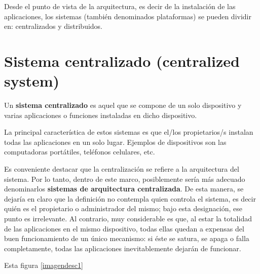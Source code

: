 \documentclass[12pt]{report} %
\begin{document}
\begin{itemize}
Desde el punto de vista de la arquitectura, es decir de la instalación de las aplicaciones, los sistemas (también denominados plataformas) se pueden dividir en: centralizados y distribuidos. 

\section{Sistema centralizado (centralized system)}

Un \textbf{sistema centralizado} es aquel que se compone de un solo dispositivo y varias aplicaciones o funciones instaladas en dicho dispositivo.

La principal característica de estos sistemas es que el/los propietarios/s instalan todas las aplicaciones en un solo lugar. Ejemplos de dispositivos son las computadoras portátiles, teléfonos celulares, etc.  

Es conveniente destacar que la centralización se refiere a la arquitectura del sistema. Por lo tanto, dentro de este marco, posiblemente sería más adecuado denominarlos \textbf{sistemas de arquitectura centralizada}. De esta manera, se dejaría en claro que la definición no contempla quien controla el sistema, es decir quién es el propietario o administrador del mismo; bajo esta designación, ese punto es irrelevante. Al contrario, muy considerable es que, al estar la totalidad de las aplicaciones en el mismo dispositivo, todas ellas quedan a expensas del buen funcionamiento de un único mecanismo: si éste se satura, se apaga o falla completamente, todas las aplicaciones inevitablemente dejarán de funcionar.

Esta figura \ref{imagendesc1}


\end{itemize}
\end{document}
